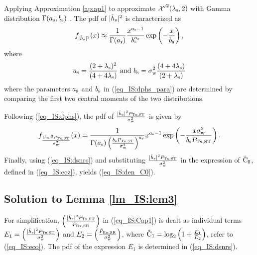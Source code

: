 {\begin{IEEEproof}[Solution]
Applying Approximation \ref{ap:ap1} to approximate $\ncchi2(\ls, 2)$ with Gamma distribution $\Gamma(a_{\text{s}}, b_{\text{s}})$ \cite{abramo}. The pdf of $|\hat{h}_{\text{s}}|^2$ is characterized as  
\begin{align}
f_{|\hat{h}_{\text{s}}|^2}(x) \approx \frac{1}{\Gamma(a_{\text{s}})} \frac{x^{a_{\text{s}} - 1}}{b_{\text{s}}^{a_{\text{s}}}} \exp\left(-\frac{x}{b_{\text{s}}}\right), 
\label{eq_IS:dphs}
\end{align}
where
\begin{align}
a_{\text{s}} = \frac{(2 + \lambda_{\text{s}})^2}{(4 + 4\lambda_{\text{s}})} \text{ and }  b_{\text{s}} = \sigma^2_{\text{w}} \frac{(4 + 4\lambda_{\text{s}})}{(2 + \lambda_{\text{s}})} \label{eq_IS:dphs_para}
\end{align} 
where the parameters $a_{\text{s}}$ and $b_{\text{s}}$ in (\ref{eq_IS:dphs_para}) are determined by comparing the first two central moments of the two distributions. 

Following (\ref{eq_IS:dphs}), the pdf of $\frac{|\hat{h}_{\text{s}}|^2P_{\text{Tx,ST}}}{\sigma^2_{\text{w}}}$ is given by 
\begin{align}
f_{\frac{ |\hat{h}_{\text{s}}|^2 P_{\text{Tx,ST}}}{\sigma^2_{\text{w}}}}(x) =  \frac{1}{\Gamma(a_{\text{s}}) \left(\frac{b_{\text{s}} P_{\text{Tx,ST}}}{\sigma^2_{\text{w}}}\right)^{a_{\text{s}}}} x^{a_{\text{s}} - 1} \exp\left(-\frac{x \sigma^2_{\text{w}}}{ b_{\text{s}} P_{\text{Tx,ST}}}\right). \label{eq_IS:dsnrs}
\end{align}
Finally, using (\ref{eq_IS:dsnrs}) and substituting $\frac{|\hat{h}_{\text{s}}|^2P_{\text{Tx,ST}}}{\sigma^2_{\text{w}}}$ in the expression of $\hat{\text{C}}_{\text{0}}$, defined in (\ref{eq_IS:ecz}), yields (\ref{eq_IS:den_C0}). 
\end{IEEEproof}

\subsection{Solution to Lemma \ref{lm_IS:lem3}} \label{ssec_IS:lem3} 
\begin{IEEEproof}[Solution]
For simplification, $\left( \frac{|\hat{h}_{\text{s}}|^2 P_{\text{Tx,ST}}}{\hat{P}_{\text{Rx,SR}}} \right)$ in (\ref{eq_IS:Cap1}) is dealt as individual terms $E_1 = \left( \frac{|\hat{h}_{\text{s}}|^2 P_{\text{Tx,ST}}}{\sigma^2_{\text{w}}} \right)$ and $E_2 = \left(\frac{\hat{P}_{\text{Rx,SR}}}{\sigma^2_{\text{w}}} \right)$, where $\hat{\text{C}}_{\text{1}} = \log_2 \left(1 + \frac{E_1}{E_2} \right)$, refer to (\ref{eq_IS:eco}). The pdf of the expression $E_1$ is determined in (\ref{eq_IS:dsnrs}).


\end{IEEEproof}}
